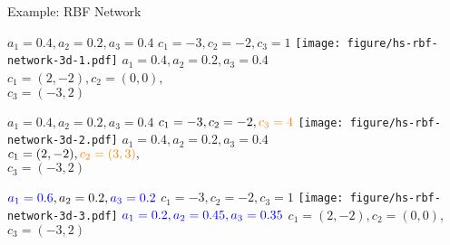 \documentclass[11pt,compress,t,notes=noshow, xcolor=table]{beamer}
\begin{document}
\begin{vbframe}{Example: RBF Network}
\begin{minipage}{0.33\textwidth}
  \begin{center}
    $a_1 = 0.4, a_2 = 0.2, a_3 = 0.4$
    $c_1 = -3, c_2 = -2, c_3 = 1$
    \texttt{[image: figure/hs-rbf-network-3d-1.pdf]}
    $a_1 = 0.4, a_2 = 0.2, a_3 = 0.4$ \\
    $c_1 = (2,-2), c_2 = (0,0)$, \\
    $c_3 = (-3,2)$
  \end{center}
\end{minipage}%
\begin{minipage}{0.33\textwidth}
  \begin{center}
    $a_1 = 0.4, a_2 = 0.2, a_3 = 0.4$
    $c_1 = -3, c_2 = -2, \textcolor{orange}{c_3 = 4}$
    \texttt{[image: figure/hs-rbf-network-3d-2.pdf]}
    $a_1 = 0.4, a_2 = 0.2, a_3 = 0.4$ \\
    $c_1 = (2,-2), \textcolor{orange}{c_2 = (3,3)},$ \\
    $c_3 = (-3,2)$
  \end{center}
\end{minipage}%
\begin{minipage}{0.33\textwidth}
  \begin{center}
    $\textcolor{blue}{a_1 = 0.6}, a_2 = 0.2, \textcolor{blue}{a_3 = 0.2}$
    $c_1 = -3, c_2 = -2, c_3 = 1$
    \texttt{[image: figure/hs-rbf-network-3d-3.pdf]}
    $\textcolor{blue}{a_1 = 0.2, a_2 = 0.45, a_3 = 0.35}$
    $c_1 = (2,-2), c_2 = (0,0),$ \\
    $c_3 = (-3,2)$
  \end{center}
\end{minipage}

\normalsize


\end{vbframe}


\endlecture
\end{document}
